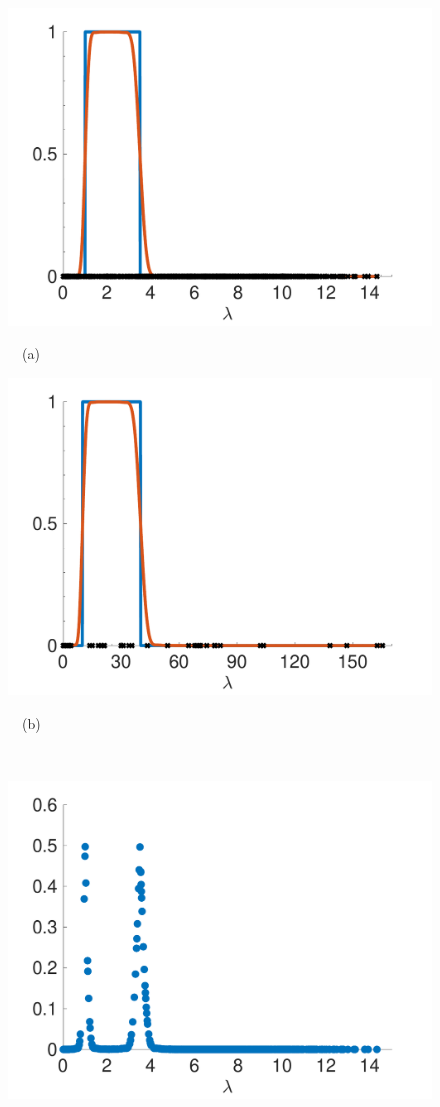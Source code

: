 \documentclass[journal, 10pt]{IEEEtran}
\begin{document}
\begin{figure}[tb]
\begin{minipage}[m]{0.49\linewidth}
\centerline{\includegraphics[width=.9\linewidth]{fig_approx_filter_sensor}}
\centerline{~~\small{(a)}}
\end{minipage}
\begin{minipage}[m]{0.49\linewidth}
\centerline{\includegraphics[width=.9\linewidth]{fig_approx_filter_net25}}
\centerline{~~\small{(b)}}
\end{minipage} \\
\begin{minipage}[m]{0.49\linewidth}
\centerline{\includegraphics[width=.9\linewidth]{fig_approx_filter_sensor_error}}

\end{minipage}
\end{figure}
\end{document}
